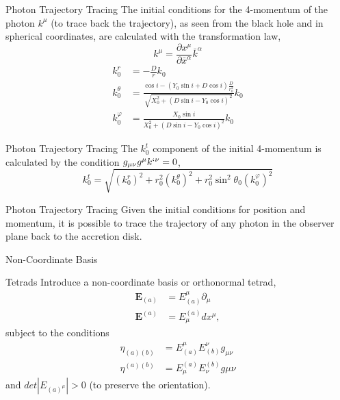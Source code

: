 \documentclass{beamer}
\begin{document}
\begin{darkframes}
\begin{frame}{Photon Trajectory Tracing}
	The initial conditions for the 4-momentum of the photon $k^\mu$ (to trace back the trajectory), as seen from the black hole and in spherical coordinates, are calculated with the transformation law,
	\[ k^\mu = \frac{\partial x^\mu}{\partial \bar{x}^\alpha} \bar{k}^\alpha \]
	\pause
	\footnotesize
    \begin{align*}
	k_0^r &= -\frac{D}{r} k_0\\     
    k_0^\theta &= \frac{\cos i - (Y_0 \sin i + D \cos i)\frac{D}{r_0^2} }{\sqrt{X_0^2 + (D \sin i - Y_0 \cos i)^2}} k_0\\
    k_0^\varphi &= \frac{X_0 \sin i}{X_0^2 + (D \sin i - Y_0 \cos i)^2} k_0
    \end{align*}
\end{frame}

\begin{frame}{Photon Trajectory Tracing}
	The $k^t_0$ component of the initial 4-momentum is calculated by the condition $g_{\mu\nu} g^\mu k`^\nu = 0 $,
	\[ k_0 ^t = \sqrt{(k_0^r)^2 + r_0^2 (k_0^\theta)^2 + r_0^2 \sin^2 \theta_0 (k_0^\varphi)^2}\]
\end{frame}

\begin{frame}{Photon Trajectory Tracing}
	Given the initial conditions for position and momentum, it is possible to trace  the trajectory of any photon in the observer plane back to the accretion disk.
\end{frame}

\begin{frame}
	\huge
    {Non-Coordinate Basis}
\end{frame}

\begin{frame}{Tetrads}
	Introduce a non-coordinate basis or orthonormal tetrad,
	\pause
	\begin{align*}
	\textbf{E}_{(a)} &= E_{(a)}^\mu \partial_\mu \\
	\textbf{E}^{(a)} &= E^{(a)}_\mu dx^\mu,
	\end{align*}
	subject to the conditions
	\begin{align*}
	\eta_{(a)(b)} &= E_{(a)}^\mu E_{(b)}^\nu g_{\mu\nu} \\
	\eta^{(a)(b)} &= E^{(a)}_\mu E^{(b)}_\nu g{\mu\nu}
	\end{align*}
	and $ det |E_{(a)^\mu} | >0$ (to preserve the orientation).
\end{frame}


\end{darkframes}
\end{document}
